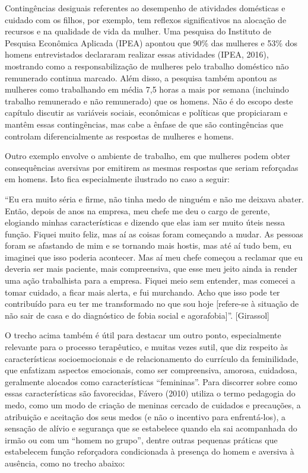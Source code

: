 Contingências desiguais referentes ao desempenho de atividades domésticas e cuidado com os filhos, por exemplo, tem reflexos significativos na alocação de recursos e na qualidade de vida da mulher. Uma pesquisa do Instituto de Pesquisa Econômica Aplicada (IPEA) apontou que 90\% das mulheres e 53\% dos homens entrevistados declararam realizar essas atividades (IPEA, 2016), mostrando como a responsabilização de mulheres pelo trabalho doméstico não remunerado continua marcado. Além disso, a pesquisa também apontou as mulheres como trabalhando em média 7,5 horas a mais por semana (incluindo trabalho remunerado e não remunerado) que os homens. Não é do escopo deste capítulo discutir as variáveis sociais, econômicas e políticas que propiciaram e mantêm essas contingências, mas cabe a ênfase de que são contingências que controlam diferencialmente as respostas de mulheres e homens.

Outro exemplo envolve o ambiente de trabalho, em que mulheres podem obter consequências aversivas por emitirem as mesmas respostas que seriam reforçadas em homens. Isto fica especialmente ilustrado no caso a seguir:

``Eu era muito séria e firme, não tinha medo de ninguém e não me deixava abater. Então, depois de anos na empresa, meu chefe me deu o cargo de gerente, elogiando minhas características e dizendo que elas iam ser muito úteis nessa função. Fiquei muito feliz, mas aí as coisas foram começando a mudar. As pessoas foram se afastando de mim e se tornando mais hostis, mas até aí tudo bem, eu imaginei que isso poderia acontecer. Mas aí meu chefe começou a reclamar que eu deveria ser mais paciente, mais compreensiva, que esse meu jeito ainda ia render uma ação trabalhista para a empresa. Fiquei meio sem entender, mas comecei a tomar cuidado, a ficar mais alerta, e fui murchando. Acho que isso pode ter contribuído para eu ter me transformado no que sou hoje [refere-se à situação de não sair de casa e do diagnóstico de fobia social e agorafobia]''. [Girassol]

O trecho acima também é útil para destacar um outro ponto, especialmente relevante para o processo terapêutico, e muitas vezes sutil, que diz respeito às características socioemocionais e de relacionamento do currículo da feminilidade, que enfatizam aspectos emocionais, como ser compreensiva, amorosa, cuidadosa, geralmente alocados como características ``femininas''. Para discorrer sobre como essas características são favorecidas, Fávero (2010) utiliza o termo pedagogia do medo, como um modo de criação de meninas cercado de cuidados e precauções, a atribuição e aceitação dos seus medos (e não o incentivo para enfrentá-los), a sensação de alívio e segurança que se estabelece quando ela sai acompanhada do irmão ou com um ``homem no grupo'', dentre outras pequenas práticas que estabelecem função reforçadora condicionada à presença do homem e aversiva à ausência, como no trecho abaixo:

